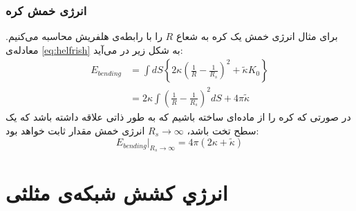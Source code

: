 \subsubsection{
انرژی خمش کره
}
برای مثال انرژی خمش یک کره به شعاع 
$R$
را با رابطه‌ی هلفریش محاسبه می‌کنیم. معادله‌ی 
\ref{eq:helfrish}
به شکل زیر در می‌آید:
\begin{equation}
\begin{aligned}
E_{bending}&=\int dS\left\{2\kappa \left(\frac{1}{R}-\frac{1}{R_s}\right)^2 +\tilde \kappa K_0\right\} \\
&=2\kappa\int \left(\frac{1}{R}-\frac{1}{R_s}\right)^2dS +4\pi\tilde \kappa
\end{aligned}
\end{equation}
در صورتی که کره را از ماده‌ای ساخته باشیم که به طور ذاتی علاقه داشته باشد که یک سطح تخت باشد،‌
$R_s\rightarrow\infty$
انرژی خمش مقدار ثابت خواهد بود:
\begin{equation}
E_{bending}|_{R_s\rightarrow\infty}=4\pi(2\kappa+\tilde\kappa)
\end{equation} 









\section{
انرژي کشش شبکه‌ی مثلثی
}

